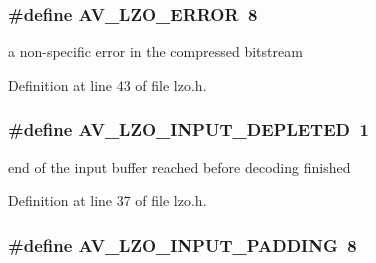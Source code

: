 \subsubsection[{\texorpdfstring{A\+V\+\_\+\+L\+Z\+O\+\_\+\+E\+R\+R\+OR}{AV_LZO_ERROR}}]{\setlength{\rightskip}{0pt plus 5cm}\#define A\+V\+\_\+\+L\+Z\+O\+\_\+\+E\+R\+R\+OR~8}\hypertarget{group__lavu__lzo_gad8076b8656b50ac499d0f18bf887ed13}{}\label{group__lavu__lzo_gad8076b8656b50ac499d0f18bf887ed13}


a non-\/specific error in the compressed bitstream 



Definition at line 43 of file lzo.\+h.

\subsubsection[{\texorpdfstring{A\+V\+\_\+\+L\+Z\+O\+\_\+\+I\+N\+P\+U\+T\+\_\+\+D\+E\+P\+L\+E\+T\+ED}{AV_LZO_INPUT_DEPLETED}}]{\setlength{\rightskip}{0pt plus 5cm}\#define A\+V\+\_\+\+L\+Z\+O\+\_\+\+I\+N\+P\+U\+T\+\_\+\+D\+E\+P\+L\+E\+T\+ED~1}\hypertarget{group__lavu__lzo_ga5f66b9a81147a79b747deb6ccacb3ad5}{}\label{group__lavu__lzo_ga5f66b9a81147a79b747deb6ccacb3ad5}


end of the input buffer reached before decoding finished 



Definition at line 37 of file lzo.\+h.

\subsubsection[{\texorpdfstring{A\+V\+\_\+\+L\+Z\+O\+\_\+\+I\+N\+P\+U\+T\+\_\+\+P\+A\+D\+D\+I\+NG}{AV_LZO_INPUT_PADDING}}]{\setlength{\rightskip}{0pt plus 5cm}\#define A\+V\+\_\+\+L\+Z\+O\+\_\+\+I\+N\+P\+U\+T\+\_\+\+P\+A\+D\+D\+I\+NG~8}\hypertarget{group__lavu__lzo_ga396ab17a8ae4cd3cef02747796f5f8f7}{}\label{group__lavu__lzo_ga396ab17a8ae4cd3cef02747796f5f8f7}


